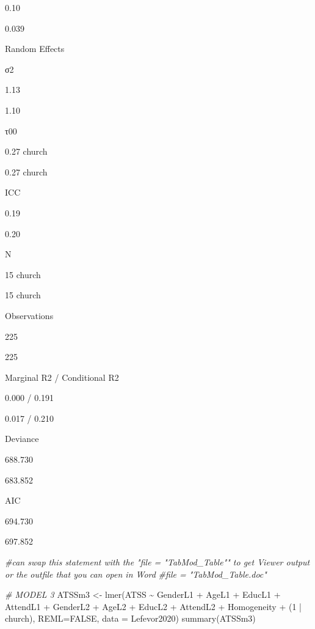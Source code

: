 \documentclass[
  11pt,
]{book}
\newenvironment{Shaded}{\begin{snugshade}}{\end{snugshade}}
\newcommand{\AttributeTok}[1]{\textcolor[rgb]{0.77,0.63,0.00}{#1}}
\newcommand{\CommentTok}[1]{\textcolor[rgb]{0.56,0.35,0.01}{\textit{#1}}}
\newcommand{\ConstantTok}[1]{\textcolor[rgb]{0.00,0.00,0.00}{#1}}
\newcommand{\DecValTok}[1]{\textcolor[rgb]{0.00,0.00,0.81}{#1}}
\newcommand{\FunctionTok}[1]{\textcolor[rgb]{0.00,0.00,0.00}{#1}}
\newcommand{\NormalTok}[1]{#1}
\newcommand{\OtherTok}[1]{\textcolor[rgb]{0.56,0.35,0.01}{#1}}
\newcommand{\SpecialCharTok}[1]{\textcolor[rgb]{0.00,0.00,0.00}{#1}}
\begin{document}
0.10

0.039

Random Effects

σ2

1.13

1.10

τ00

0.27 church

0.27 church

ICC

0.19

0.20

N

15 church

15 church

Observations

225

225

Marginal R2 / Conditional R2

0.000 / 0.191

0.017 / 0.210

Deviance

688.730

683.852

AIC

694.730

697.852

\begin{Shaded}
\begin{Highlighting}[]
\CommentTok{\#can swap this statement with the "file = "TabMod\_Table"" to get Viewer output or the outfile that you can open in Word}
\CommentTok{\#file = "TabMod\_Table.doc"}
\end{Highlighting}
\end{Shaded}

\begin{Shaded}
\begin{Highlighting}[]
\CommentTok{\# MODEL 3}
\NormalTok{ATSSm3 }\OtherTok{\textless{}{-}} \FunctionTok{lmer}\NormalTok{(ATSS }\SpecialCharTok{\textasciitilde{}}\NormalTok{ GenderL1 }\SpecialCharTok{+}\NormalTok{ AgeL1 }\SpecialCharTok{+}\NormalTok{ EducL1 }\SpecialCharTok{+}\NormalTok{ AttendL1 }\SpecialCharTok{+}\NormalTok{ GenderL2 }\SpecialCharTok{+}\NormalTok{ AgeL2 }\SpecialCharTok{+}\NormalTok{ EducL2 }\SpecialCharTok{+}\NormalTok{ AttendL2 }\SpecialCharTok{+}\NormalTok{ Homogeneity }\SpecialCharTok{+}\NormalTok{ (}\DecValTok{1} \SpecialCharTok{|}\NormalTok{ church), }\AttributeTok{REML=}\ConstantTok{FALSE}\NormalTok{, }\AttributeTok{data =}\NormalTok{ Lefevor2020)}
\FunctionTok{summary}\NormalTok{(ATSSm3)}
\end{Highlighting}
\end{Shaded}
\end{document}
